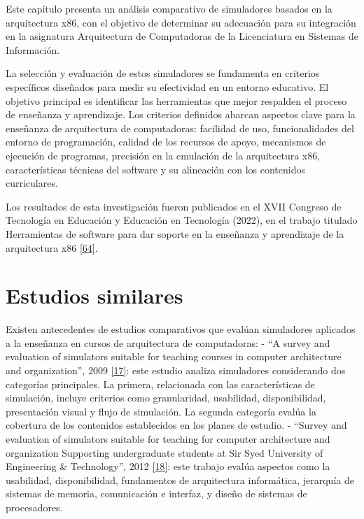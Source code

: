 \documentclass[12pt,oneside]{templates/unerthesis}
\begin{document}
Este capítulo presenta un análisis comparativo de simuladores basados en la arquitectura x86, con el objetivo de determinar su adecuación para su integración en la asignatura Arquitectura de Computadoras de la Licenciatura en Sistemas de Información.

La selección y evaluación de estos simuladores se fundamenta en criterios específicos diseñados para medir su efectividad en un entorno educativo. El objetivo principal es identificar las herramientas que mejor respalden el proceso de enseñanza y aprendizaje. Los criterios definidos abarcan aspectos clave para la enseñanza de arquitectura de computadoras: facilidad de uso, funcionalidades del entorno de programación, calidad de los recursos de apoyo, mecanismos de ejecución de programas, precisión en la emulación de la arquitectura x86, características técnicas del software y su alineación con los contenidos curriculares.

Los resultados de esta investigación fueron publicados en el XVII Congreso de Tecnología en Educación y Educación en Tecnología (2022), en el trabajo titulado Herramientas de software para dar soporte en la enseñanza y aprendizaje de la arquitectura x86 \protect\hyperlink{ref-colombani_herramientas_2022}{{[}64{]}}.

\hypertarget{estudios-similares}{%
\section{Estudios similares}\label{estudios-similares}}

Existen antecedentes de estudios comparativos que evalúan simuladores aplicados a la enseñanza en cursos de arquitectura de computadoras:
- ``A survey and evaluation of simulators suitable for teaching courses in computer architecture and organization'', 2009 \protect\hyperlink{ref-nikolic_survey_2009}{{[}17{]}}: este estudio analiza simuladores considerando dos categorías principales. La primera, relacionada con las características de simulación, incluye criterios como granularidad, usabilidad, disponibilidad, presentación visual y flujo de simulación. La segunda categoría evalúa la cobertura de los contenidos establecidos en los planes de estudio.
- ``Survey and evaluation of simulators suitable for teaching for computer architecture and organization Supporting undergraduate students at Sir Syed University of Engineering \& Technology'', 2012 \protect\hyperlink{ref-hasan_survey_2012}{{[}18{]}}: este trabajo evalúa aspectos como la usabilidad, disponibilidad, fundamentos de arquitectura informática, jerarquía de sistemas de memoria, comunicación e interfaz, y diseño de sistemas de procesadores.
\end{document}
